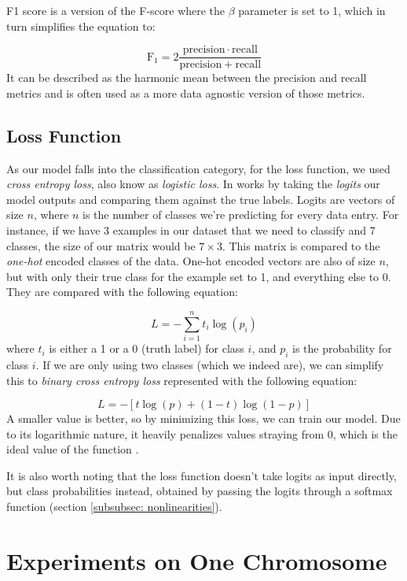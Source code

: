 \documentclass[times, utf8, diplomski, english]{fer_eng}
\begin{document}
F1 score is a version of the F-score where the $\beta$ parameter is set to 1, which in turn simplifies the equation to:

\[ \mathrm{F_1} = 2 \frac{\mathrm{precision} \cdot \mathrm{recall}}{\mathrm{precision} + \mathrm{recall}} \]
It can be described as the harmonic mean between the precision and recall metrics and is often used as a more data agnostic version of those metrics.

\subsection{Loss Function}
\label{subsec:loss function}

As our model falls into the classification category, for the loss function, we used \textit{cross entropy loss}, also know as \textit{logistic loss}. In works by taking the \textit{logits} our model outputs and comparing them against the true labels. Logits are vectors of size $n$, where $n$ is the number of classes we're predicting for every data entry. For instance, if we have 3 examples in our dataset that we need to classify and 7 classes, the size of our matrix would be $7 \times 3$. This matrix is compared to the \textit{one-hot} encoded classes of the data. One-hot encoded vectors are also of size $n$, but with only their true class for the example set to 1, and everything else to 0. They are compared with the following equation:

\[ L = - \sum_{i = 1}^n t_i \log (p_i) \]
where $t_i$ is either a 1 or a 0 (truth label) for class $i$, and $p_i$ is the probability for class $i$. If we are only using two classes (which we indeed are), we can simplify this to \textit{binary cross entropy loss} represented with the following equation:

\[ L = - [t \log (p) + (1 - t) \log (1 - p)] \]
A smaller value is better, so by minimizing this loss, we can train our model. Due to its logarithmic nature, it heavily penalizes values straying from 0, which is the ideal value of the function \cite{CEL}.

It is also worth noting that the loss function doesn't take logits as input directly, but class probabilities instead, obtained by passing the logits through a softmax function (section \ref{subsubsec: nonlinearities}).

\section{Experiments on One Chromosome}
\label{sec:experiments on one chromosome}
\end{document}
